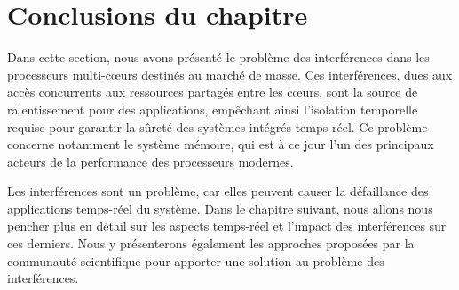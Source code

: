 \section{Conclusions du chapitre}

Dans cette section, nous avons présenté le problème des interférences dans les processeurs multi-cœurs destinés au marché de masse.
Ces interférences, dues aux accès concurrents aux ressources partagés entre les cœurs, sont la source de ralentissement pour des applications, empêchant ainsi l'isolation temporelle requise pour garantir la sûreté des systèmes intégrés temps-réel.
Ce problème concerne notamment le système mémoire, qui est à ce jour l'un des principaux acteurs de la performance des processeurs modernes.




Les interférences sont un problème, car elles peuvent causer la défaillance des applications temps-réel du système.
Dans le chapitre suivant, nous allons nous pencher plus en détail sur les aspects temps-réel et l'impact des interférences sur ces derniers.
Nous y présenterons également les approches proposées par la communauté scientifique pour apporter une solution au problème des interférences.